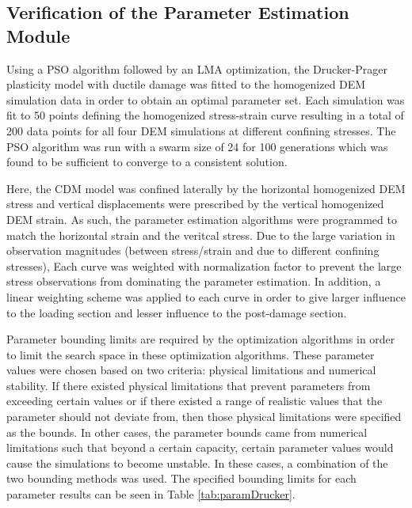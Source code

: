 \subsection{Verification of the Parameter Estimation Module}

Using a PSO algorithm followed by an LMA optimization, the Drucker-Prager plasticity model with ductile damage was fitted to the homogenized DEM simulation data in order to obtain an optimal parameter set. Each simulation was fit to 50 points defining the homogenized stress-strain curve resulting in a total of 200 data points for all four DEM simulations at different confining stresses. The PSO algorithm was run with a swarm size of 24 for 100 generations which was found to be sufficient to converge to a consistent solution. 

Here, the CDM model was confined laterally by the horizontal homogenized DEM stress and vertical displacements were prescribed by the vertical homogenized DEM strain. As such, the parameter estimation algorithms were programmed to match the horizontal strain and the veritcal stress. Due to the large variation in observation magnitudes (between stress/strain and due to different confining stresses), Each curve was weighted with normalization factor to prevent the large stress observations from dominating the parameter estimation. In addition, a linear weighting scheme was applied to each curve in order to give larger influence to the loading section and lesser influence to the post-damage section.

Parameter bounding limits are required by the optimization algorithms in order to limit the search space in these optimization algorithms. These parameter values were chosen based on two criteria: physical limitations and numerical stability. If there existed physical limitations that prevent parameters from exceeding certain values or if there existed a range of realistic values that the parameter should not deviate from, then those physical limitations were specified as the bounds. In other cases, the parameter bounds came from numerical limitations such that beyond a certain capacity, certain parameter values would cause the simulations to become unstable. In these cases, a combination of the two bounding methods was used. The specified bounding limits for each parameter results can be seen in Table \ref{tab:paramDrucker}.

